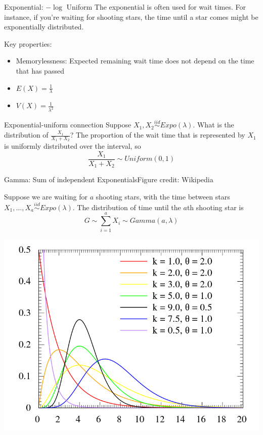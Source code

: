 \documentclass{beamer}
\begin{document}
\begin{frame}{Exponential: $-\log$ Uniform}
The exponential is often used for wait times. For instance, if you're waiting for shooting stars, the time until a star comes might be exponentially distributed.

Key properties:
\begin{itemize}
\item Memorylessness: Expected remaining wait time does not depend on the time that has passed
\item $E(X)=\frac{1}{\lambda}$
\item $V(X)=\frac{1}{\lambda^2}$
\end{itemize}
\end{frame}

\begin{frame}{Exponential-uniform connection}
Suppose $X_1,X_2\stackrel{iid}{\sim} Expo(\lambda)$. What is the distribution of $\frac{X_1}{X_1+X_2}$?
\pause
The proportion of the wait time that is represented by $X_1$ is uniformly distributed over the interval, so
$$\frac{X_1}{X_1+X_2}\sim Uniform(0,1)$$
\end{frame}

\begin{frame}{Gamma: Sum of independent Exponentials}{Figure credit: Wikipedia}
\begin{definition}
Suppose we are waiting for $a$ shooting stars, with the time between stars $X_1,\dots,X_a\stackrel{iid}{\sim}Expo(\lambda)$. The distribution of time until the $a$th shooting star is
$$G\sim \sum_{i=1}^a X_i\sim Gamma(a,\lambda)$$
\end{definition}
\begin{center}\includegraphics[scale=.15]{figures/GammaPDF.png}\end{center}
\end{frame}
\end{document}
